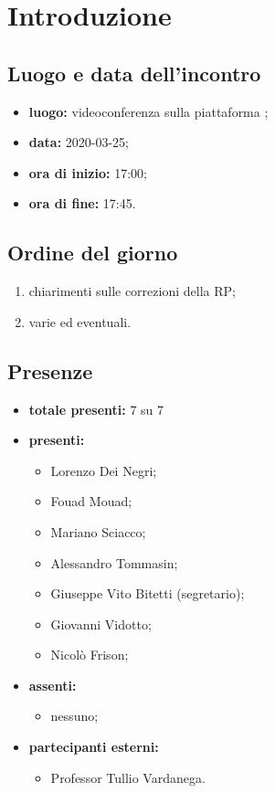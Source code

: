 \section*{Introduzione}

\subsection*{Luogo e data dell'incontro}
	\begin{itemize}
		\item \textbf{luogo:} videoconferenza sulla piattaforma ;
		\item \textbf{data:} 2020-03-25;
		\item \textbf{ora di inizio:} 17:00;
		\item \textbf{ora di fine:} 17:45.
	\end{itemize}

\subsection*{Ordine del giorno}
	\begin{enumerate}
		\item chiarimenti sulle correzioni della RP;
  		\item varie ed eventuali.
	\end{enumerate}

\subsection*{Presenze}
	\begin{itemize}
		\item \textbf{totale presenti:} 7 su 7
		\item \textbf{presenti: }
			\begin{itemize}
				\item Lorenzo Dei Negri;
				\item Fouad Mouad;
				\item Mariano Sciacco;
				\item Alessandro Tommasin;
				\item Giuseppe Vito Bitetti (segretario);
				\item Giovanni Vidotto;
				\item Nicolò Frison;
			\end{itemize}
		\item \textbf{assenti: }
			\begin{itemize}
				\item nessuno;
			\end{itemize}
		\item  \textbf{partecipanti esterni:}
			\begin{itemize}
				\item Professor Tullio Vardanega.
			\end{itemize}
	\end{itemize}


